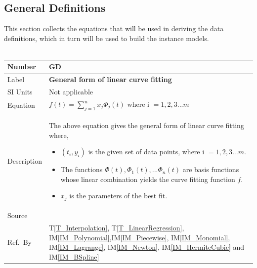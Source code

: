 \documentclass[12pt]{article}
\newcommand{\colAwidth}{0.13\textwidth}
\newcommand{\colBwidth}{0.82\textwidth}
\newcounter{defnum} %
\newcommand{\tref}[1]{T\ref{#1}}
\newcommand{\iref}[1]{IM\ref{#1}}
\begin{document}
\subsection{General Definitions}\label{sec_gendef}

This section collects the equations that will be used in deriving the
data definitions, which in turn will be used to build the instance models.\\

~\newline
\noindent
\begin{minipage}{\textwidth}
	\renewcommand*{\arraystretch}{1.5}
	\begin{tabular}{| p{\colAwidth} | p{\colBwidth}|}
		\hline
		\rowcolor[gray]{0.9}
		Number& GD{defnum}\thedefnum
		\label{GD_CurveFitEq}\\
		\hline
		Label &\bf General form of linear curve fitting\\
		\hline
		SI Units& Not applicable\\
		\hline
		Equation & $f(t) = \sum_{j=1}^{n}x_j \Phi_j (t)$ where i $= 1,2,3...m$\\
		\hline
		Description & The above equation gives the general form of linear curve fitting where,
		\begin{itemize}
			\item $(t_i,y_i)$ is the given set of data points, where i $= 1,2, 3...m$.
			\item The functions $\Phi(t), \Phi_1(t), ... \Phi_n(t)$ are basis functions whose linear combination yields the curve fitting function $f$.
			\item $x_j$ is the parameters of the best fit.
		\end{itemize}\\
		\hline
		Source & ~\cite{Health1997}\\
		\hline
		
		Ref.\ By &\tref{T_Interpolation}, \tref{T_LinearRegression}, \iref{IM_Polynomial},\iref{IM_Piecewise}, \iref{IM_Monomial}, \iref{IM_Lagrange}, \iref{IM_Newton}, \iref{IM_HermiteCubic} and \iref{IM_BSpline}\\
		\hline
	\end{tabular}
\end{minipage}\\
\end{document}
